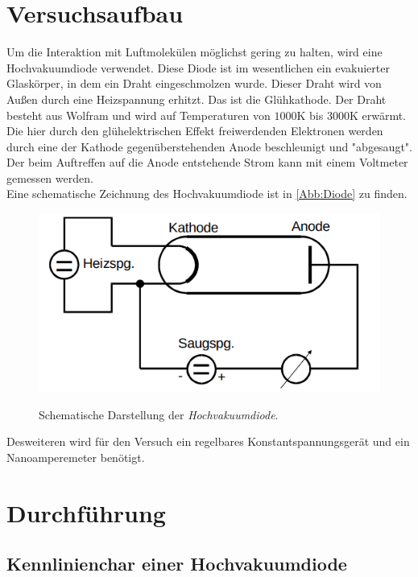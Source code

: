 \section{Versuchsaufbau}
\label{sec:Versuchsaufbau}

Um die Interaktion mit Luftmolekülen möglichst gering zu 
halten, wird eine Hochvakuumdiode verwendet. Diese Diode
ist im wesentlichen ein evakuierter Glaskörper, in dem ein
Draht eingeschmolzen wurde. Dieser Draht wird von Außen 
durch eine Heizspannung erhitzt. Das ist die Glühkathode.
Der Draht besteht aus Wolfram und wird auf Temperaturen
von $1000 \si{\kelvin}$ bis $3000 \si{\kelvin}$ erwärmt.
Die hier durch den glühelektrischen Effekt freiwerdenden 
Elektronen werden durch eine der Kathode gegenüberstehenden
Anode beschleunigt und "abgesaugt". Der beim Auftreffen
auf die Anode entstehende Strom kann mit einem Voltmeter 
gemessen werden.\\
Eine schematische Zeichnung des Hochvakuumdiode ist in 
\autoref{Abb:Diode} zu finden.
\begin{figure}[H]
    \centering
    \caption{Schematische Darstellung der \textit{Hochvakuumdiode}.\cite{sample}}
    \includegraphics[width=\textwidth]{Bilder/Diode.png}
    \label{Abb:Diode}
\end{figure}

Desweiteren wird für den Versuch ein regelbares Konstantspannungsgerät
und ein Nanoamperemeter benötigt.

\section{Durchführung}
\label{sec:Durchführung}

\subsection{Kennlinienchar einer Hochvakuumdiode}

